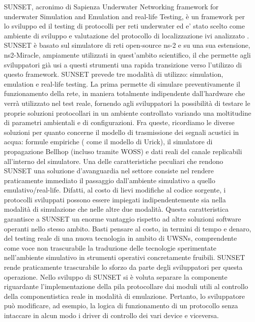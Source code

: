 \documentclass[Lau,binding=0.6cm]{sapthesis}
\begin{document}
SUNSET, acronimo di Sapienza Underwater Networking framework for underwater Simulation and Emulation and real-life Testing, è un framework per lo sviluppo ed il testing di protocolli per reti underwater ed e' stato scelto come ambiente di sviluppo e valutazione del protocollo di localizzazione ivi analizzato \cite{sunset}.\newline
SUNSET è basato sul simulatore di reti open-source ns-2 e su una sua estensione, ns2-Miracle, ampiamente utilizzati in quest'ambito scientifico, il che permette agli sviluppatori già usi a questi strumenti una rapida transizione verso l'utilizzo di questo framework.
SUNSET prevede tre modalità di utilizzo: simulation, emulation e real-life testing.
La prima permette di simulare preventivamente il funzionamento della rete, in maniera totalmente indipendente dall'hardware che verrà utilizzato nel test reale, fornendo agli sviluppatori la possibilità di testare le proprie soluzioni protocollari in un ambiente controllato variando una moltitudine di parametri ambientali e di configurazioni. Fra queste, ricordiamo le diverse soluzioni per quanto concerne il modello di trasmissione dei segnali acustici in acqua: formule empiriche ( come il modello di Urick), il simulatore di propagazione Bellhop (incluso tramite WOSS) e dati reali del canale replicabili all'interno del simulatore.
\newline
Una delle caratteristiche peculiari che rendono SUNSET una soluzione d'avanguardia nel settore consiste nel rendere praticamente immediato il passaggio dall'ambiente simulativo a quello emulativo/real-life. Difatti, al costo di lievi modifiche al codice sorgente, i protocolli sviluppati possono essere impiegati indipendentemente sia nella modalità di simulazione che nelle altre due modalità. Questa caratteristica garantisce a SUNSET un enorme vantaggio rispetto ad altre soluzioni software operanti nello stesso ambito. Basti pensare al costo, in termini di tempo e denaro, del testing reale di una nuova tecnologia in ambito di UWSNs, comprendente come voce non trascurabile la traduzione delle tecnologie sperimentate nell'ambiente simulativo in strumenti operativi concretamente fruibili. SUNSET rende praticamente trascurabile lo sforzo da parte degli sviluppatori per questa operazione.
\newline
Nello sviluppo di SUNSET si è voluta separare la componente riguardante l'implementazione della pila protocollare dai moduli utili al controllo della componentistica reale in modalità di emulazione. Pertanto, lo sviluppatore può modificare, ad esempio, la logica di funzionamento di un protocollo senza intaccare in alcun modo i driver di controllo dei vari device e viceversa.
\end{document}
